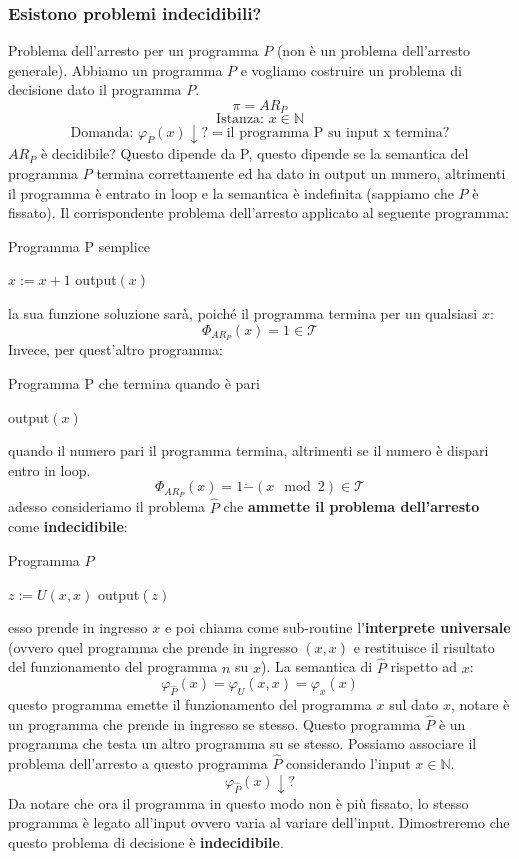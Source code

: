 \documentclass{article}
\begin{document}
\subsubsection{Esistono problemi indecidibili?}
Problema dell'arresto per un programma $P$ (non è un problema dell'arresto generale).
Abbiamo un programma $P$ e vogliamo costruire un problema di decisione dato
il programma $P$.
$$\pi=AR_P$$
$$\text{Istanza: }x\in\mathbb{N}$$
$$\text{Domanda: }\varphi_P(x)\downarrow?=\text{il programma P su input x termina?}$$
$AR_P$ è decidibile? Questo dipende da P, questo dipende se la semantica del programma
$P$ termina correttamente ed ha dato in output un numero, altrimenti il programma
è entrato in loop e la semantica è indefinita (sappiamo che $P$ è fissato).
\newline\newline
Il corrispondente problema dell'arresto applicato al seguente programma:
\begin{algorithm}[hbt!]
    \caption{Programma P semplice}\label{alg:p_halt}
    $x:=x+1$\;
    output$(x)$\;
\end{algorithm}
la sua funzione soluzione sarà, poiché il programma termina per un qualsiasi $x$:
$$\Phi_{AR_P}(x)=1\in\mathcal{T}$$
Invece, per quest'altro programma:
\begin{algorithm}[hbt!]
    \caption{Programma P che termina quando è pari}\label{alg:p_halt_pari}
    output$(x)$\;
\end{algorithm}
quando il numero pari il programma termina, altrimenti se il numero è dispari
entro in loop.
$$\Phi_{AR_P}(x)=1\dot{-}(x \mod{2})\in\mathcal{T}$$
adesso consideriamo il problema $\hat{P}$ che \textbf{ammette il problema dell'arresto} come
\textbf{indecidibile}:
\begin{algorithm}[hbt!]
    \caption{Programma $\hat{P}$}\label{alg:p_hat}
    $z:=U(x,x)$\;
    output$(z)$\;
\end{algorithm}
esso prende in ingresso $x$ e poi chiama come sub-routine l'\textbf{interprete universale}
(ovvero quel programma che prende in ingresso $(x,x)$ e restituisce il risultato
del funzionamento del programma $n$ su $x$). La semantica di $\hat{P}$ rispetto
ad $x$:
$$\varphi_{\hat{P}}(x)=\varphi_U(x,x)=\varphi_x(x)$$
questo programma emette il funzionamento del programma $x$ sul dato $x$, notare è un
programma che prende in ingresso se stesso. Questo programma $\hat{P}$ è un programma
che testa un altro programma su se stesso.
Possiamo associare il problema dell'arresto a questo programma $\hat{P}$ considerando
l'input $x\in\mathbb{N}$.
$$\varphi_{\hat{P}}(x)\downarrow?$$
Da notare che ora il programma in questo modo non è più fissato, lo stesso programma
è legato all'input ovvero varia al variare dell'input. Dimostreremo che
questo problema di decisione è \textbf{indecidibile}.
\end{document}
